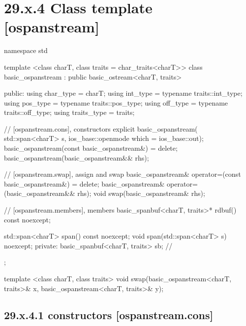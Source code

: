 \documentclass[ebook,11pt,article]{memoir}
\renewcommand{\iref}[1]{[#1]}
\begin{document}
\section{29.x.4 Class template  [ospanstream] }

\begin{codeblock}
namespace std {
  template <class charT, class traits = char_traits<charT>>
  class basic_ospanstream
    : public basic_ostream<charT, traits> {
  public:
    using char_type      = charT;
    using int_type       = typename traits::int_type;
    using pos_type       = typename traits::pos_type;
    using off_type       = typename traits::off_type;
    using traits_type    = traits;

    // \iref{ospanstream.cons}, constructors
    explicit basic_ospanstream(
      std::span<charT> s,
      ios_base::openmode which = ios_base::out);
    basic_ospanstream(const basic_ospanstream&) = delete;
    basic_ospanstream(basic_ospanstream&& rhs);

    // \iref{ospanstream.swap}, assign and swap
    basic_ospanstream& operator=(const basic_ospanstream&) = delete;
    basic_ospanstream& operator=(basic_ospanstream&& rhs);
    void swap(basic_ospanstream& rhs);

    // \iref{ospanstream.members}, members
    basic_spanbuf<charT, traits>* rdbuf() const noexcept;

    std::span<charT> span() const noexcept;
    void span(std::span<charT> s) noexcept;
  private:
    basic_spanbuf<charT, traits> sb; // \expos
  };

  template <class charT, class traits>
    void swap(basic_ospanstream<charT, traits>& x,
              basic_ospanstream<charT, traits>& y);
}
\end{codeblock}


\subsection{29.x.4.1  constructors [ospanstream.cons]}
\label{ospanstream.cons}
\end{document}
